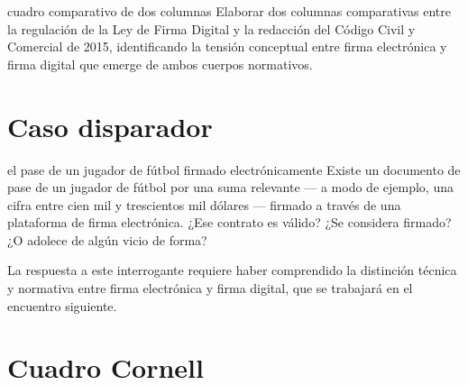 \documentclass[12pt,oneside]{book}
\begin{document}
\begin{exercise}{cuadro comparativo de dos columnas}
Elaborar dos columnas comparativas entre la regulación de la Ley de Firma Digital y la redacción del Código Civil y Comercial de 2015, identificando la tensión conceptual entre firma electrónica y firma digital que emerge de ambos cuerpos normativos.
\end{exercise}

\section{Caso disparador}

\begin{exercise}{el pase de un jugador de fútbol firmado electrónicamente}
Existe un documento de pase de un jugador de fútbol por una suma relevante --- a modo de ejemplo, una cifra entre cien mil y trescientos mil dólares --- firmado a través de una plataforma de firma electrónica. ¿Ese contrato es válido? ¿Se considera firmado? ¿O adolece de algún vicio de forma?

La respuesta a este interrogante requiere haber comprendido la distinción técnica y normativa entre firma electrónica y firma digital, que se trabajará en el encuentro siguiente.
\end{exercise}

\section{Cuadro Cornell}
\end{document}
